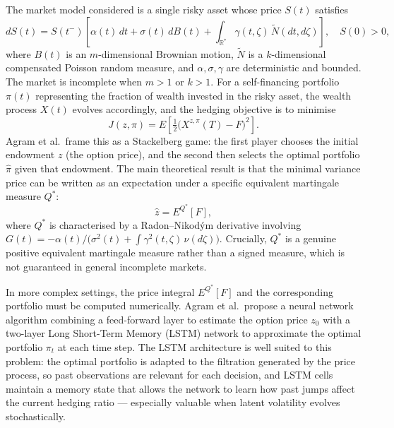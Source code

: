 \documentclass[12pt]{article}
\begin{document}
The market model considered is a single risky asset whose price $S(t)$ satisfies
\begin{equation}
dS(t) = S(t^-)\!\left[\alpha(t)\,dt + \sigma(t)\,dB(t) + \int_{\mathbb{R}^*}\!\gamma(t,\zeta)\,\tilde{N}(dt,d\zeta)\right],\quad S(0)>0,
\end{equation}
where $B(t)$ is an $m$-dimensional Brownian motion, $\tilde{N}$ is a $k$-dimensional compensated Poisson random measure, and $\alpha, \sigma, \gamma$ are deterministic and bounded. The market is incomplete when $m > 1$ or $k > 1$. For a self-financing portfolio $\pi(t)$ representing the fraction of wealth invested in the risky asset, the wealth process $X(t)$ evolves accordingly, and the hedging objective is to minimise
\begin{equation}
J(z,\pi) = E\!\left[\tfrac{1}{2}\bigl(X^{z,\pi}(T) - F\bigr)^2\right].
\end{equation}
Agram et al.\ frame this as a Stackelberg game: the first player chooses the initial endowment $z$ (the option price), and the second then selects the optimal portfolio $\hat{\pi}$ given that endowment. The main theoretical result is that the minimal variance price can be written as an expectation under a specific equivalent martingale measure $Q^*$:
\begin{equation}
\hat{z} = E^{Q^*}[F],
\end{equation}
where $Q^*$ is characterised by a Radon--Nikod\'{y}m derivative involving $G(t) = -\alpha(t)/\bigl(\sigma^2(t) + \int\gamma^2(t,\zeta)\,\nu(d\zeta)\bigr)$. Crucially, $Q^*$ is a genuine positive equivalent martingale measure rather than a signed measure, which is not guaranteed in general incomplete markets.

In more complex settings, the price integral $E^{Q^*}[F]$ and the corresponding portfolio must be computed numerically. Agram et al.\ propose a neural network algorithm combining a feed-forward layer to estimate the option price $z_0$ with a two-layer Long Short-Term Memory (LSTM) network to approximate the optimal portfolio $\pi_t$ at each time step. The LSTM architecture is well suited to this problem: the optimal portfolio is adapted to the filtration generated by the price process, so past observations are relevant for each decision, and LSTM cells maintain a memory state that allows the network to learn how past jumps affect the current hedging ratio --- especially valuable when latent volatility evolves stochastically.
\end{document}
